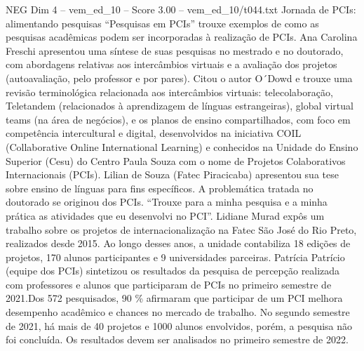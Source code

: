 \begin{textsample}{NEG Dim 4 – vem\_ed\_10 – Score 3.00 – vem\_ed\_10/t044.txt}  \label{ex:f4_neg_035}
Jornada de PCIs: alimentando pesquisas “Pesquisas em PCIs” trouxe exemplos de como as pesquisas acadêmicas podem ser incorporadas à realização de PCIs.
Ana Carolina Freschi apresentou uma síntese de suas pesquisas no mestrado e no doutorado, com abordagens relativas aos intercâmbios virtuais e a avaliação dos projetos (autoavaliação, pelo professor e por pares).
Citou o autor O´Dowd e trouxe uma revisão terminológica relacionada aos intercâmbios virtuais: telecolaboração, Teletandem (relacionados à aprendizagem de línguas estrangeiras), global virtual teams (na área de negócios), e os planos de ensino compartilhados, com foco em competência intercultural e digital, desenvolvidos na iniciativa COIL (Collaborative Online International Learning) e conhecidos na Unidade do Ensino Superior (Cesu) do Centro Paula Souza com o nome de Projetos Colaborativos Internacionais (PCIs).
Lilian de Souza (Fatec Piracicaba) apresentou sua tese sobre ensino de línguas para fins específicos.
A problemática tratada no doutorado se originou dos PCIs. “Trouxe para a minha pesquisa e a minha prática as atividades que eu desenvolvi no PCI”.
Lidiane Murad expôs um trabalho sobre os projetos de internacionalização na Fatec São José do Rio Preto, realizados desde 2015.
Ao longo desses anos, a unidade contabiliza 18 edições de projetos, 170 alunos participantes e 9 universidades parceiras.
Patrícia Patrício (equipe dos PCIs) sintetizou os resultados da pesquisa de percepção realizada com professores e alunos que participaram de PCIs no primeiro semestre de 2021.Dos 572 pesquisados, 90 \% afirmaram que participar de um PCI melhora desempenho acadêmico e chances no mercado de trabalho.
No segundo semestre de 2021, há mais de 40 projetos e 1000 alunos envolvidos, porém, a pesquisa não foi concluída.
Os resultados devem ser analisados no primeiro semestre de 2022.

\end{textsample}
